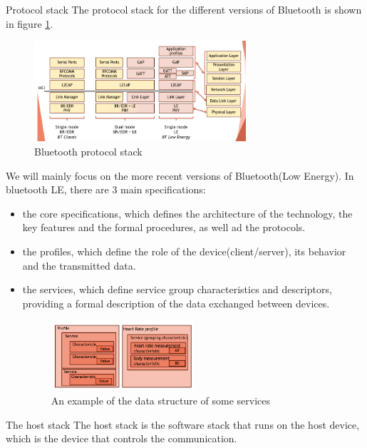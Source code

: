 \begin{section}{Protocol stack}
  The protocol stack for the different versions of Bluetooth is shown in figure \ref{fig:bluetooth stack}.
  \begin{figure}[H]
    \centering
    \includegraphics[width=0.7\textwidth]{img/wireless/bluetooth protocol tack.png}
    \caption{Bluetooth protocol stack}
    \label{fig:bluetooth stack}
  \end{figure}
  We will mainly focus on the more recent versions of Bluetooth(Low Energy).
  In bluetooth LE, there are 3 main specifications:
  \begin{itemize}
    \item the core specifications, which defines the architecture of the technology, the key features
      and the formal procedures, as well ad the protocols. 
    \item the profiles, which define the role of the device(client/server), its behavior and the
      transmitted data.
    \item the services, which define service group characteristics and descriptors, providing a 
      formal description of the data exchanged between devices.
    \begin{figure}[H]
      \centering
      \includegraphics[width=0.5\textwidth]{img/wireless/bluetooth services format.png}
      \caption{An example of the data structure of some services}
    \end{figure}
  \end{itemize}
  \begin{subsection}{The host stack}
    The host stack is the software stack that runs on the host device, which is the device that 
    controls the communication. 
    \begin{figure}[H]

\end{figure}
\end{subsection}
\end{section}

